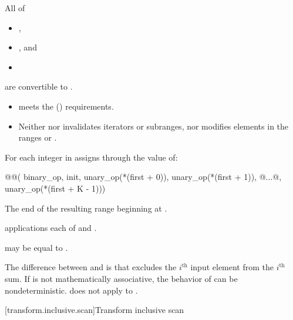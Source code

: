 \begin{itemdescr}
\pnum
\mandates
  All of
  \begin{itemize}
  \item {},
  \item {}, and
  \item {}
  \end{itemize}
  are convertible to .

\pnum
\expects
\begin{itemize}
\item
   meets the  () requirements.
\item
  Neither  nor 
  invalidates iterators or subranges, nor modifies elements in
  the ranges  or .
\end{itemize}

\pnum
\effects
For each integer  in 
assigns through  the value of:
\begin{codeblock}
@@(
    binary_op, init,
    unary_op(*(first + 0)), unary_op(*(first + 1)), @$\dotsc$@, unary_op(*(first + K - 1)))
\end{codeblock}

\pnum
\returns
The end of the resulting range beginning at .

\pnum
\complexity
{} applications each
of  and .

\pnum
\remarks
{} may be equal to .

\pnum
\begin{note}
The difference between  and
 is that 
excludes the $i^\text{th}$ input element from the $i^\text{th}$ sum.
If  is not mathematically associative,
the behavior of  can be nondeterministic.
does not apply  to .
\end{note}
\end{itemdescr}

[transform.inclusive.scan]{Transform inclusive scan}


